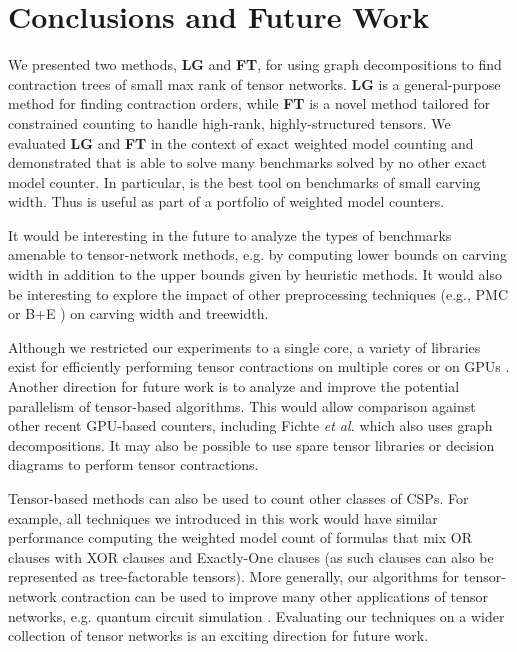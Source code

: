\section{Conclusions and Future Work} \label{sec:tensors:conclusion}
We presented two methods, \textbf{LG} and \textbf{FT}, for using graph decompositions to find contraction trees of small max rank of tensor networks. \textbf{LG} is a general-purpose method for finding contraction orders, while \textbf{FT} is a novel method tailored for constrained counting to handle high-rank, highly-structured tensors. We evaluated \textbf{LG} and \textbf{FT} in the context of exact weighted model counting and demonstrated that  is able to solve many benchmarks solved by no other exact model counter. In particular,  is the best tool on benchmarks of small carving width. Thus  is useful as part of a portfolio of weighted model counters. 

It would be interesting in the future to analyze the types of benchmarks amenable to tensor-network methods, e.g. by computing lower bounds on carving width in addition to the upper bounds given by heuristic methods. It would also be interesting to explore the impact of other preprocessing techniques (e.g., PMC \cite{LM14} or B+E \cite{LLM16}) on carving width and treewidth.

Although we restricted our experiments to a single core, a variety of libraries exist for efficiently performing tensor contractions on multiple cores or on GPUs \cite{KSTKPPRS19,NRBHHJN15}. Another direction for future work is to analyze and improve the potential parallelism of tensor-based algorithms. This would allow comparison against other recent GPU-based counters, including Fichte \emph{et al.}  which also uses graph decompositions. It may also be possible to use spare tensor libraries \cite{FWS20} or decision diagrams \cite{BFGHMPS97} to perform tensor contractions.

Tensor-based methods can also be used to count other classes of CSPs. For example, all techniques we introduced in this work would have similar performance computing the weighted model count of formulas that mix OR clauses with XOR clauses and Exactly-One clauses (as such clauses can also be represented as tree-factorable tensors). More generally, our algorithms for tensor-network contraction can be used to improve many other applications of tensor networks, e.g. quantum circuit simulation \cite{MS08}. Evaluating our techniques on a wider collection of tensor networks is an exciting direction for future work. %





